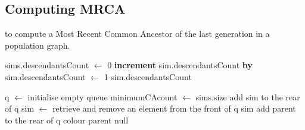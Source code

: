 \documentclass{l4proj}
\begin{document}
\subsection{Computing MRCA}

\begin{algorithm}
\centering
\caption{to compute a Most Recent Common Ancestor of the last generation in a population graph.}
\label{MRCA1}
\begin{algorithmic}[1]
    \State {}
\EndFor
\State \Return {}
\EndProcedure

\State sims.descendantsCount $\gets$ 0
\Else {} 
\EndIf
{}
\State \textbf{increment} sim.descendantsCount \textbf{by} 
\EndFor
{}
\State sim.descendantsCount $\gets$ 1
\EndIf
\State\Return sim.descendantsCount
\EndProcedure

\State q $\gets$ initialise empty queue
\State minimumCAcount $\gets$ sims.size
\State add sim to the rear of q
\EndFor
{}
  \State sim $\gets$ retrieve and remove an element from the front of q
   \Return sim
  \EndIf
      \State add parent to the rear of q
      \State colour parent
    \EndIf
    \EndFor
\EndWhile
\State \Return null
\EndProcedure

\end{algorithmic}
\end{algorithm}
\end{document}
